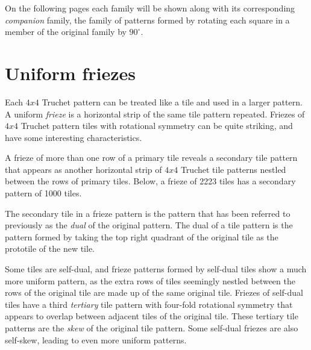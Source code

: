 \documentclass{tufte-book}
\begin{document}
\vspace{0.5cm}

\noindent
On the following pages each family will be shown along with its corresponding \textit{companion} family, the family of patterns formed by rotating each square in a member of the original family by $90^{\circ}$. 

\newpage



% 
% 
\chapter{Uniform friezes}

\noindent
Each $4x4$ Truchet pattern can be treated like a tile and used in a larger pattern. A uniform \textit{frieze} is a horizontal strip of the same tile pattern repeated. Friezes of $4x4$ Truchet pattern tiles with rotational symmetry can be quite striking, and have some interesting characteristics. 

\vspace{0.5cm}
\noindent
A frieze of more than one row of a primary tile reveals a secondary tile pattern that appears as another horizontal strip of $4x4$ Truchet tile patterns nestled between the rows of primary tiles. Below, a frieze of 2223 tiles has a secondary pattern of 1000 tiles.
\,

\vspace{0.5cm}


\vspace{0.5cm}
\noindent
The secondary tile in a frieze pattern is the pattern that has been referred to previously as the \textit{dual} of the original pattern. The dual of a tile pattern is the pattern formed by taking the top right quadrant of the original tile as the prototile of the new tile.

\vspace{0.5cm}
\noindent
Some tiles are self-dual, and frieze patterns formed by self-dual tiles show a much more uniform pattern, as the extra rows of tiles seemingly nestled between the rows of the original tile are made up of the same original tile. Friezes of self-dual tiles have a third \textit{tertiary} tile pattern with four-fold rotational symmetry that appears to overlap between adjacent tiles of the original tile. These tertiary tile patterns are the \textit{skew} of the original tile pattern. Some self-dual friezes are also self-skew, leading to even more uniform patterns.
\end{document}
